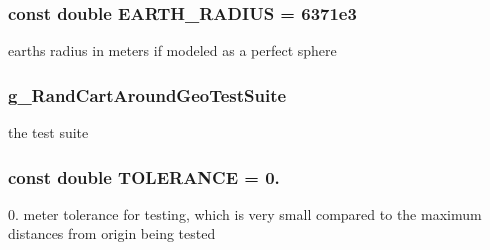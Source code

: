 \subsubsection[{\texorpdfstring{E\+A\+R\+T\+H\+\_\+\+R\+A\+D\+I\+US}{EARTH_RADIUS}}]{\setlength{\rightskip}{0pt plus 5cm}const double E\+A\+R\+T\+H\+\_\+\+R\+A\+D\+I\+US = 6371e3\hspace{0.3cm}{\ttfamily [static]}}\hypertarget{rand-cart-around-geo-test_8cc_a2cb7703740f4124ff50163bdc2b0d1da}{}\label{rand-cart-around-geo-test_8cc_a2cb7703740f4124ff50163bdc2b0d1da}


earth\textquotesingle{}s radius in meters if modeled as a perfect sphere 

\subsubsection[{\texorpdfstring{g\+\_\+\+Rand\+Cart\+Around\+Geo\+Test\+Suite}{g_RandCartAroundGeoTestSuite}}]{ g\+\_\+\+Rand\+Cart\+Around\+Geo\+Test\+Suite\hspace{0.3cm}{\ttfamily [static]}}\hypertarget{rand-cart-around-geo-test_8cc_a27b3ef727181ca7661f4d96d211c78c9}{}\label{rand-cart-around-geo-test_8cc_a27b3ef727181ca7661f4d96d211c78c9}


the test suite 

\subsubsection[{\texorpdfstring{T\+O\+L\+E\+R\+A\+N\+CE}{TOLERANCE}}]{\setlength{\rightskip}{0pt plus 5cm}const double T\+O\+L\+E\+R\+A\+N\+CE = 0.}\hypertarget{rand-cart-around-geo-test_8cc_a89311a98397f9d6967d2cb10d5152d77}{}\label{rand-cart-around-geo-test_8cc_a89311a98397f9d6967d2cb10d5152d77}
0. meter tolerance for testing, which is very small compared to the maximum distances from origin being tested 